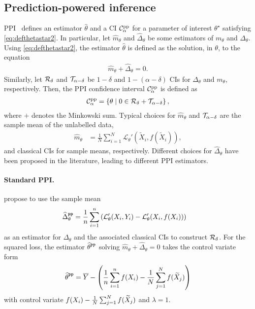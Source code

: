\subsection{Prediction-powered inference}
PPI~\citep{Angelopoulos2023} defines an estimator $\widehat \theta$ and a CI $\mathcal C_\alpha^{\mathrm{pp}}$ for a parameter of interest $\theta^\star$ satisfying \cref{eq:defthetastar2}.
In particular, let $\widehat m_\theta$ and $\widehat \Delta_\theta$ be some estimators of $m_\theta$ and $\Delta_\theta$. Using \cref{eq:defthetastar2}, the estimator $\widehat \theta$ is defined as the solution, in $\theta$, to the equation
\begin{align}
    \widehat m_\theta + \widehat \Delta_\theta=0.
\end{align}
Similarly, let $\mathcal R_\delta$ and $\mathcal T_{\alpha-\delta}$ be $1 - \delta$ and $1 - (\alpha - \delta)$ CIs for $\Delta_\theta$ and $m_\theta$, respectively. Then, the PPI confidence interval $\mathcal C_\alpha^{\mathrm{pp}}$ is defined as
\begin{align}
    \mathcal C_\alpha^{\mathrm{pp}}=\left\{\theta \mid 0\in \mathcal R_\delta + \mathcal T_{\alpha-\delta}\right\}, \label{eq:ppconfidenceinterval}
\end{align}
where $+$ denotes the Minkowski sum.
Typical choices for $\widehat m_\theta$ and $\mathcal T_{\alpha-\delta}$ are the sample mean of the unlabelled data,
\begin{align}
    \widehat m_\theta&=\frac{1}{N}\sum_{i=1}^{N} \mathcal{L}_{\theta}'(\widetilde X_i,f(\widetilde X_i)), \label{eq:msamplemean}
\end{align}
and classical CIs for sample means, respectively.
Different choices for $\widehat \Delta_\theta$ have been proposed in the literature, leading to different PPI estimators.

\paragraph{Standard PPI.}
\citet{Angelopoulos2023} propose to use the sample mean
\begin{align}
    \widehat \Delta^{\mathrm{\texttt{PP}}}_\theta&=\frac{1}{n}\sum_{i=1}^n \left(\mathcal{L}_{\theta}'(X_i,Y_i)-\mathcal{L}_{\theta}'(X_i,f(X_i))\right)\label{eq:deltasamplemean}
\end{align}
as an estimator for $\Delta_\theta$ and the associated classical CIs to construct $\mathcal R_\delta$.
For the squared loss, the estimator $\widehat\theta^{\mathrm{\texttt{PP}}}$ solving $\widehat m_\theta + \widehat \Delta_\theta=0$ takes the control variate form
\begin{align}
    \widehat\theta^{\mathrm{\texttt{PP}}}= \overline Y - \left( \frac{1}{n}\sum_{i=1}^n f(X_i) - \frac{1}{N}\sum_{j=1}^{N} f(\widetilde X_j)     \right) \label{eq:thetahatppi}
\end{align}
with control variate $f(X_i)-\frac{1}{N}\sum_{j=1}^{N} f(\widetilde X_j)$ and $\lambda=1$.

